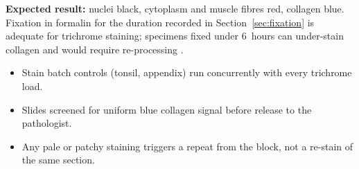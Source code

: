 \vspace{5pt}

\vspace{6pt}
\textbf{Expected result:} nuclei black, cytoplasm and muscle fibres red, collagen blue.
Fixation in formalin for the duration recorded in Section~\ref{sec:fixation} is adequate
for trichrome staining; specimens fixed under 6~hours can under-stain collagen and would
require re-processing \citep{suvarna2018bancrofts}.

\vspace{6pt}
\begin{itemize}
  \item Stain batch controls (tonsil, appendix) run concurrently with every trichrome load.
  \item Slides screened for uniform blue collagen signal before release to the pathologist.
  \item Any pale or patchy staining triggers a repeat from the block, not a re-stain of the
        same section.
\end{itemize}
